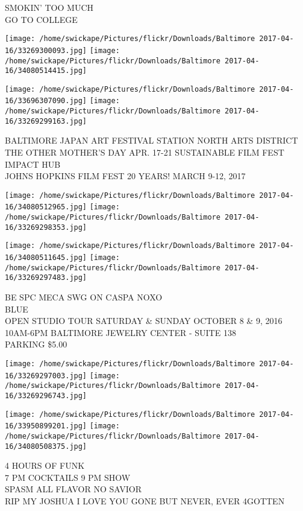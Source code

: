 \documentclass[10pt,letterpaper]{article}
\begin{document}
SMOKIN' TOO MUCH\\
GO TO COLLEGE\\
\pagebreak

\texttt{[image: /home/swickape/Pictures/flickr/Downloads/Baltimore 2017-04-16/33269300093.jpg]}
\texttt{[image: /home/swickape/Pictures/flickr/Downloads/Baltimore 2017-04-16/34080514415.jpg]}

\texttt{[image: /home/swickape/Pictures/flickr/Downloads/Baltimore 2017-04-16/33696307090.jpg]}
\texttt{[image: /home/swickape/Pictures/flickr/Downloads/Baltimore 2017-04-16/33269299163.jpg]}

BALTIMORE JAPAN ART FESTIVAL STATION NORTH ARTS DISTRICT\\
THE OTHER MOTHER'S DAY APR. 17{-}21 SUSTAINABLE FILM FEST\\
IMPACT HUB\\
JOHNS HOPKINS FILM FEST 20 YEARS!  MARCH 9{-}12, 2017\\
\pagebreak

\texttt{[image: /home/swickape/Pictures/flickr/Downloads/Baltimore 2017-04-16/34080512965.jpg]}
\texttt{[image: /home/swickape/Pictures/flickr/Downloads/Baltimore 2017-04-16/33269298353.jpg]}

\texttt{[image: /home/swickape/Pictures/flickr/Downloads/Baltimore 2017-04-16/34080511645.jpg]}
\texttt{[image: /home/swickape/Pictures/flickr/Downloads/Baltimore 2017-04-16/33269297483.jpg]}

BE SPC MECA SWG ON CASPA NOXO\\
BLUE\\
OPEN STUDIO TOUR SATURDAY \& SUNDAY OCTOBER 8 \& 9, 2016 10AM{-}6PM BALTIMORE JEWELRY CENTER {-} SUITE 138\\
PARKING \$5.00\\
\pagebreak

\texttt{[image: /home/swickape/Pictures/flickr/Downloads/Baltimore 2017-04-16/33269297003.jpg]}
\texttt{[image: /home/swickape/Pictures/flickr/Downloads/Baltimore 2017-04-16/33269296743.jpg]}

\texttt{[image: /home/swickape/Pictures/flickr/Downloads/Baltimore 2017-04-16/33950899201.jpg]}
\texttt{[image: /home/swickape/Pictures/flickr/Downloads/Baltimore 2017-04-16/34080508375.jpg]}

4 HOURS OF FUNK\\
7 PM COCKTAILS 9 PM SHOW\\
SPASM ALL FLAVOR NO SAVIOR\\
RIP MY JOSHUA I LOVE YOU GONE BUT NEVER, EVER 4GOTTEN\\
\pagebreak
\end{document}
